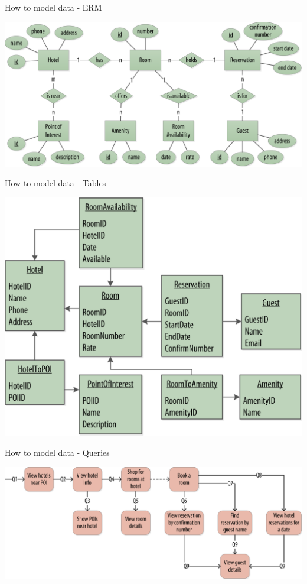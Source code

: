\documentclass[
  10pt
]{beamer}
\begin{document}
\begin{frame}{How to model data - ERM \cite{cassandra_oreilly}}
  \begin{center}
    \includegraphics[width=0.75\columnwidth]{resources/model_example_entity_relation_step0.png}
  \end{center}
\end{frame}

\begin{frame}{How to model data - Tables \cite{cassandra_oreilly}}
  \begin{center}
    \includegraphics[width=0.75\columnwidth]{resources/model_example_rdbms_step1.png}
  \end{center}
\end{frame}

\begin{frame}{How to model data - Queries \cite{cassandra_oreilly}}
  \begin{center}
    \includegraphics[width=0.75\columnwidth]{resources/model_example_queries_step2.png}
  \end{center}
\end{frame}
\end{document}
